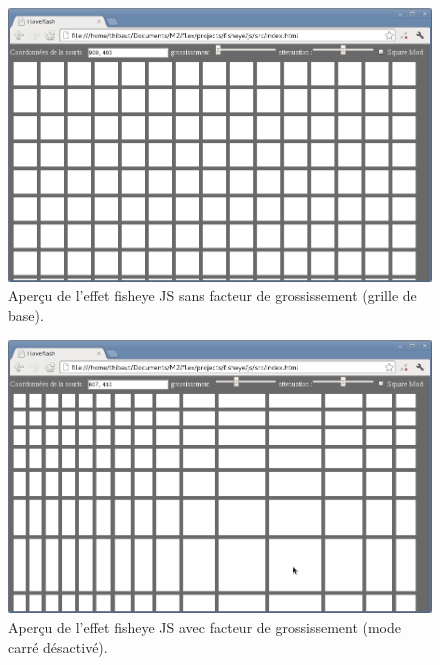 \begin{figure}[H]
  \centering
  \includegraphics[width=\textwidth]{../resources/illustrations/js_screen_1}
  \caption{Aperçu de l'effet fisheye JS sans facteur de grossissement (grille de base).}
  \label{fig:js_6}
\end{figure}
\begin{minipage}[H]{.5\textwidth}
\begin{figure}[H]
  \centering
  \includegraphics[width=\textwidth]{../resources/illustrations/js_screen_2}
  \caption{Aperçu de l'effet fisheye JS avec facteur de grossissement (mode carré désactivé).}
  \label{fig:js_6}
\end{figure}
\end{minipage}

